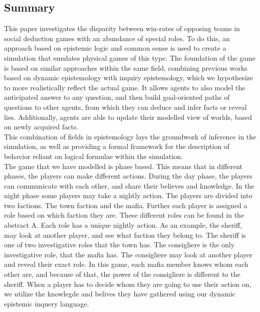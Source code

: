 \onecolumn
\begin{center}
	\section*{Summary}\label{sec:summary}
\end{center}
This paper investigates the disparity between win-rates of opposing teams in
social deduction games with an abundance of special roles. To do  this, an
approach based on epistemic logic and common sense is used to create a
simulation that emulates physical games of this type. The foundation of the
game is based on similar approaches within the same field, combining previous works based on dynamic epistemology with inquiry epistemology,
which we hypothesize to more realistically reflect the actual game. It allows agents to also model the anticipated answer to any question, and then build goal-oriented
paths of questions to other agents, from which they can deduce and infer facts or reveal lies. Additionally, agents are able to update their modelled view of worlds, based on newly acquired facts. \\
This combination of fields in epistemology lays the groundwork of inference in the simulation,
as well as providing a formal framework for the description of behavior
reliant on logical formulae within the simulation. \\
The game that we have modelled is phase based. This means that in different phases, the players can make different actions. During the day phase, the players can communicate with each other, and share their believes and knowledge. In the night phase some players may take a nightly action. The players are divided into two factions. The town faction and the mafia. Further each player is assigned a role based on which faction they are. These different roles can be found in the abstract A. Each role has a unique nightly action. As an example, the sheriff, may look at another player, and see what faction they belong to. The sheriff is one of two investigative roles that the town has. The consigliere is the only investigative role, that the mafia has. The consigliere may look at another player and reveal their exact role. In this game, each mafia member knows whom each other are, and because of that, the power of the consigliere is different to the sheriff.
When a player has to decide whom they are going to use their action on, we utilize the knowlegde and belives they have gathered using our dynamic epistemic inquery language. \\
